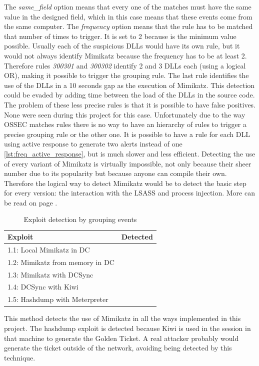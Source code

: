 \linej
The \textit{same\_field} option means that every one of the matches must have the same value in the designed field, which in this case means that these events come from the same computer.
\linej
The \textit{frequency} option means that the rule has to be matched that number of times to trigger. It is set to 2 because is the minimum value possible.
\linej
\linej
Usually each of the suspicious DLLs would have its own rule, but it would not always identify Mimikatz because the frequency has to be at least 2. Therefore rules \textit{300301} and \textit{300302} identify 2 and 3 DLLs each (using a logical OR), making it possible to trigger the grouping rule.
The last rule identifies the use of the DLLs in a 10 seconds gap as the execution of Mimikatz. This detection could be evaded by adding time between the load of the DLLs in the source code.
\linej
\linej
The problem of these less precise rules is that it is possible to have false positives. None were seen during this project for this case.
\linej
Unfortunately due to the way OSSEC matches rules there is no way to have an hierarchy of rules to trigger a precise grouping rule or the other one.
It is possible to have a rule for each DLL using active response to generate two alerts instead of one \ref{lst:freq_active_response}, but is much slower and less efficient.
\linej
\linej
Detecting the use of every variant of Mimikatz is virtually impossible, not only because their sheer number due to its popularity but because anyone can compile their own. Therefore the logical way to detect Mimikatz would be to detect the basic step for every version: the interaction with the LSASS and process injection. More can be read on page \pageref{detect_lsass}.

\begin{table}[H]
	\centering
	\begin{tabular}{|l|l|}
		\hline
		\rowcolor{gray!30}
		Exploit & Detected \\ \hline
		1.1: Local Mimikatz in DC& \RYES\\ \hline
		1.2: Mimikatz from memory in DC& \RYES\\ \hline
		1.3: Mimikatz with DCSync& \RYES\\ \hline
		1.4: DCSync with Kiwi& \RYES\\ \hline
		1.5: Hashdump with Meterpreter& \RYES\\ \hline
	\end{tabular}
	\caption{Exploit detection by grouping events}
\end{table}
This method detects the use of Mimikatz in all the ways implemented in this project.
The hashdump exploit is detected because Kiwi is used in the session in that machine to generate the Golden Ticket. A real attacker probably would generate the ticket outside of the network, avoiding being detected by this technique.

